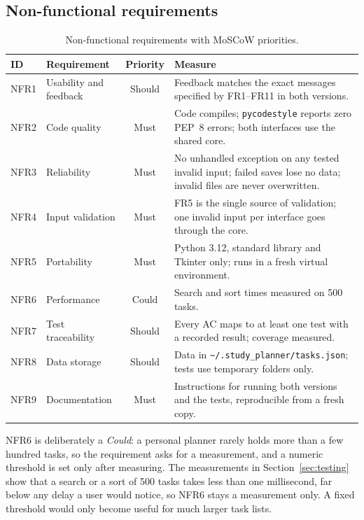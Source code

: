 \documentclass[11pt,a4paper]{article}
\newcommand{\code}[1]{\texttt{#1}}
\begin{document}
\subsection{Non-functional requirements}

\begin{table}[ht]
\centering
\small
\begin{tabularx}{\textwidth}{@{}llcX@{}}
\toprule
ID & Requirement & Priority & Measure \\
\midrule
NFR1 & Usability and feedback & Should & Feedback matches the exact messages specified by FR1--FR11 in both versions. \\
NFR2 & Code quality & Must & Code compiles; \code{pycodestyle} reports zero PEP~8 \parencite{pep8} errors; both interfaces use the shared core. \\
NFR3 & Reliability & Must & No unhandled exception on any tested invalid input; failed saves lose no data; invalid files are never overwritten. \\
NFR4 & Input validation & Must & FR5 is the single source of validation; one invalid input per interface goes through the core. \\
NFR5 & Portability & Must & Python 3.12, standard library and Tkinter only; runs in a fresh virtual environment. \\
NFR6 & Performance & Could & Search and sort times measured on 500 tasks. \\
NFR7 & Test traceability & Should & Every AC maps to at least one test with a recorded result; coverage measured. \\
NFR8 & Data storage & Should & Data in \code{\textasciitilde/.study\_planner/tasks.json}; tests use temporary folders only. \\
NFR9 & Documentation & Must & Instructions for running both versions and the tests, reproducible from a fresh copy. \\
\bottomrule
\end{tabularx}
\caption{Non-functional requirements with MoSCoW priorities.}
\label{tab:nfr}
\end{table}

NFR6 is deliberately a \emph{Could}: a personal planner rarely holds more than
a few hundred tasks, so the requirement asks for a measurement, and a numeric
threshold is set only after measuring. The measurements in
Section~\ref{sec:testing} show that a search or a sort of 500 tasks takes
less than one millisecond, far below any delay a user would notice, so NFR6
stays a measurement only. A fixed threshold would only become useful for much
larger task lists.
\end{document}
